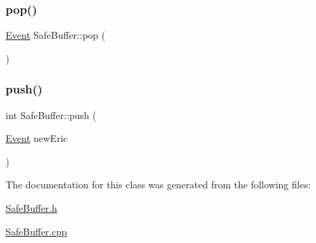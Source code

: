 \subsubsection{\texorpdfstring{pop()}{pop()}}
{\footnotesize\ttfamily \hyperlink{class_event}{Event} Safe\+Buffer\+::pop (\begin{DoxyParamCaption}{ }\end{DoxyParamCaption})}

\mbox{\label{class_safe_buffer_ac3ed0799ec2e84c97e36b22c83f7abf5}} 
\subsubsection{\texorpdfstring{push()}{push()}}
{\footnotesize\ttfamily int Safe\+Buffer\+::push (\begin{DoxyParamCaption}\item[{\hyperlink{class_event}{Event}}]{new\+Eric }\end{DoxyParamCaption})}



The documentation for this class was generated from the following files\+:\begin{DoxyCompactItemize}
\item 
\hyperlink{_safe_buffer_8h}{Safe\+Buffer.\+h}\item 
\hyperlink{_safe_buffer_8cpp}{Safe\+Buffer.\+cpp}\end{DoxyCompactItemize}
